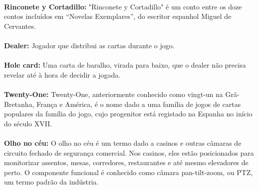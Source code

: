 \documentclass{report}
\begin{document}
\paragraph{}\hypertarget{Glossário}{\textbf{Rinconete y Cortadillo:} "Rinconete y Cortadillo" é um conto entre os doze contos incluídos em “Novelas Exemplares”, do escritor espanhol Miguel de Cervantes.}
\paragraph{}\hypertarget{Glossário}{\textbf{Dealer:} Jogador que distribui as cartas durante o jogo.}
\newline
\paragraph{}\hypertarget{Glossário}{\textbf{Hole card:} Uma carta de baralho, virada para baixo, que o dealer não precisa revelar até à hora de decidir a jogada.}
\newline
\paragraph{}\hypertarget{Glossário}{\textbf{ Twenty-One:} Twenty-One, anteriormente conhecido como vingt-un na Grã-Bretanha, França e América, é o nome dado a uma família de jogos de cartas populares da família do jogo, cujo progenitor está registado na Espanha no início do século XVII.}
\newline
\paragraph{}\hypertarget{Glossário}{\textbf{Olho no céu:} O olho no céu é um termo dado a casinos e outras câmaras de circuito fechado de segurança comercial. Nos casinos, eles estão posicionados para monitorizar assentos, mesas, corredores, restaurantes e até mesmo elevadores de perto. O componente funcional é conhecido como câmara pan-tilt-zoom, ou PTZ, um termo padrão da indústria.}
\newline

\printbibliography
\end{document}
